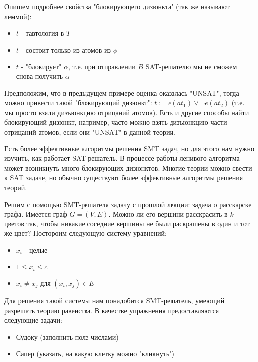 \documentclass[a4paper,12pt]{article}
\begin{document}
Опишем подробнее свойства "блокирующего дизюнкта" (так же называют леммой):\newline
\begin{itemize}
\item $t$ - тавтология в $T$
\item $t$ - состоит только из атомов из $\phi$
\item $t$ - "блокирует" $\alpha$, т.е. при отправлении $B$ SAT-решателю мы не сможем снова получить $\alpha$
\end{itemize}
Предположим, что в предыдущем примере оценка оказалась "UNSAT", тогда можно привести такой "блокирующий дизюнкт": $t := e(at_1)
\vee \lnot e(at_2)$ (т.е. мы просто взяли дизъюнкцию отрицаний атомов). Есть и другие способы найти блокирующий дизюнкт,
например, часто можно взять дизъюнкцию части отрицаний атомов, если они "UNSAT" в данной теории.\newline

Есть более эффективные алгоритмы решения SMT задач, но для этого нам нужно изучить, как работает SAT решатель. В процессе работы
ленивого алгоритма может возникнуть много блокирующих дизюнктов. Многие теории можно свести к SAT задаче, но обычно существуют
более эффективные алгоритмы решения теорий.\newline

Решим с помощью SMT-решателя задачу с прошлой лекции: задача о расскарске графа. Имеется граф $G = (V, E)$. Можно ли его вершини
расскрасить в $k$ цветов так, чтобы никакие соседние вершины не были раскрашены в один и тот же цвет? Постороим следующую
систему уравнений:\newline
\begin{itemize}
\item $x_i$ - целые
\item $1 \le x_i \le c$
\item $x_i \neq x_j$ для $(x_i, x_j) \in E$
\end{itemize}
Для решения такой системы нам понадобится SMT-решатель, умеющий разрешать теорию равенства.\newline
В качестве упражнения предоставляются следующие задачи:
\begin{itemize}
\item Судоку (заполнить поле числами)
\item Сапер (указать, на какую клетку можно "кликнуть")
\end{itemize}
\end{document}

